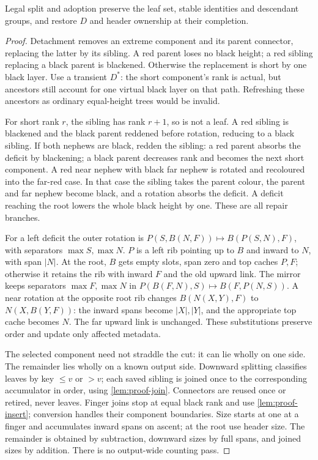 \begin{lemma}
\label{lem:proof-split}
Legal split and adoption preserve the leaf set, stable identities and
descendant groups, and restore $D$ and header ownership at their completion.
\end{lemma}
\begin{proof}
Detachment removes an extreme component and its parent connector, replacing
the latter by its sibling. A red parent loses no black height; a red sibling
replacing a black parent is blackened. Otherwise the replacement is short by
one black layer. Use a transient $D^*$: the short component's rank is actual,
but ancestors still account for one virtual black layer on that path.
Refreshing these ancestors as ordinary equal-height trees would be invalid.

For short rank $r$, the sibling has rank $r+1$, so is not a leaf.
A red sibling is blackened and the black parent reddened before rotation,
reducing to a black sibling. If both nephews are black, redden the sibling:
a red parent absorbs the deficit by blackening; a black parent decreases
rank and becomes the next short component. A red near nephew with black far
nephew is rotated and recoloured into the far-red case. In that case the
sibling takes the parent colour, the parent and far nephew become black,
and a rotation absorbs the deficit. A deficit reaching the root lowers the
whole black height by one. These are all repair branches.

For a left deficit the outer rotation is
$P(S,B(N,F))\mapsto B(P(S,N),F)$, with separators $\max S,\max N$.
$P$ is a left rib pointing up to $B$ and inward to $N$, with span $|N|$.
At the root, $B$ gets empty slots, span zero and top caches $P,F$;
otherwise it retains the rib with inward $F$ and the old upward link.
The mirror keeps separators $\max F,\max N$ in
$P(B(F,N),S)\mapsto B(F,P(N,S))$.
A near rotation at the opposite root rib changes
$B(N(X,Y),F)$ to $N(X,B(Y,F))$: the inward spans become $|X|,|Y|$,
and the appropriate top cache becomes $N$. The far upward link is unchanged.
These substitutions preserve order and update only affected metadata.

The selected component need not straddle the cut: it can lie wholly on one
side. The remainder lies wholly on a known output side. Downward splitting
classifies leaves by key $\leq v$ or $>v$; each saved sibling is joined once
to the corresponding accumulator in order, using \cref{lem:proof-join}.
Connectors are reused once or retired, never leaves. Finger joins stop at
equal black rank and use \cref{lem:proof-insert}; conversion handles their
component boundaries. Size starts at one at a finger and accumulates inward
spans on ascent; at the root use header size. The remainder is obtained by
subtraction, downward sizes by full spans, and joined sizes by addition.
There is no output-wide counting pass.


\end{proof}

